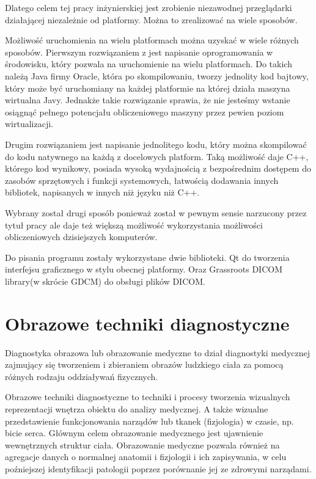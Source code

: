 Dlatego celem tej pracy inżynierskiej jest zrobienie niezawodnej przeglądarki działającej niezależnie od platformy.
Można to zrealizować na wiele sposobów.

Możliwość uruchomienia na wielu platformach można uzyskać w wiele różnych sposobów.
Pierwszym rozwiązaniem z jest napisanie oprogramowania w środowisku, który pozwala na uruchomienie na wielu platformach.
Do takich należą Java firmy Oracle, która po skompilowaniu, tworzy jednolity kod bajtowy, który może być uruchomiany na każdej platformie na której działa maszyna wirtualna Javy.
Jednakże takie rozwiązanie sprawia, że nie jesteśmy wstanie osiągnąć pełnego potencjału obliczeniowego maszyny przez pewien poziom wirtualizacji.

Drugim rozwiązaniem jest napisanie jednolitego kodu, który można skompilować do kodu natywnego na każdą z docelowych platform.
Taką możliwość daje C++, którego kod wynikowy, posiada wysoką wydajnością z bezpośrednim dostępem do zasobów sprzętowych i funkcji systemowych, łatwością dodawania innych bibliotek, napisanych w innych niż języku niż C++.

Wybrany został drugi sposób ponieważ został w pewnym sensie narzucony przez tytuł pracy ale daje też większą możliwość wykorzystania możliwości obliczeniowych dzisiejszych komputerów.

Do pisania programu zostały wykorzystane dwie biblioteki. Qt do tworzenia interfejsu graficznego w stylu obecnej platformy. Oraz Grassroots DICOM library(w skrócie GDCM) do obsługi plików DICOM.

\section{Obrazowe techniki diagnostyczne}

Diagnostyka obrazowa lub obrazowanie medyczne to dział diagnostyki medycznej zajmujący się tworzeniem i zbieraniem obrazów ludzkiego ciała za pomocą różnych rodzaju oddziaływań fizycznych.

Obrazowe techniki diagnostyczne to techniki i procesy tworzenia wizualnych reprezentacji wnętrza obiektu do analizy medycznej.
A także wizualne przedstawienie funkcjonowania narządów lub tkanek (fizjologia) w czasie, np. bicie serca.
Głównym celem obrazowanie medycznego jest ujawnienie wewnętrznych struktur ciała.
Obrazowanie medyczne pozwala również na agregacje danych o normalnej anatomii i fizjologii i ich zapisywania, w celu poźniejszej identyfikacji patologii poprzez porównanie jej ze zdrowymi narządami.

